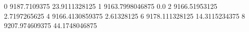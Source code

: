 0 9187.7109375 23.9111328125
1 9163.7998046875 0.0
2 9166.51953125 2.7197265625
4 9166.4130859375 2.61328125
6 9178.111328125 14.3115234375
8 9207.974609375 44.1748046875
